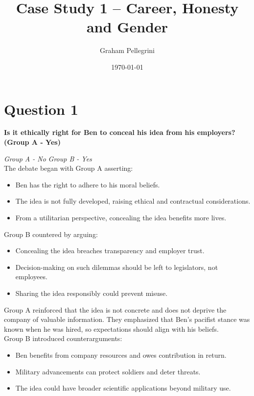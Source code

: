 \documentclass[12pt]{article}
\title{Case Study 1 – Career, Honesty and Gender}
\author{Graham Pellegrini}
\date{\today}
\begin{document}
\maketitle

\section{Question 1}
\textbf{Is it ethically right for Ben to conceal his idea from his employers? (Group A - Yes)}

\textit{Group A - No}  
\textit{Group B - Yes}\\

\noindent The debate began with Group A asserting:
{\fontsize{11pt}{13pt}\selectfont
\begin{itemize}
\setlength{\itemsep}{4pt} %
    \item Ben has the right to adhere to his moral beliefs.
    \item The idea is not fully developed, raising ethical and contractual considerations.
    \item From a utilitarian perspective, concealing the idea benefits more lives.
\end{itemize}
}

\noindent Group B countered by arguing:
{\fontsize{11pt}{13pt}\selectfont
\begin{itemize}
\setlength{\itemsep}{4pt} 
    \item Concealing the idea breaches transparency and employer trust.
    \item Decision-making on such dilemmas should be left to legislators, not employees.
    \item Sharing the idea responsibly could prevent misuse.
\end{itemize}
}

\noindent Group A reinforced that the idea is not concrete and does not deprive the company of valuable information. They emphasized that Ben's pacifist stance was known when he was hired, so expectations should align with his beliefs.\\

\noindent Group B introduced counterarguments:
{\fontsize{11pt}{13pt}\selectfont
\begin{itemize}
\setlength{\itemsep}{4pt} 
    \item Ben benefits from company resources and owes contribution in return.
    \item Military advancements can protect soldiers and deter threats.
    \item The idea could have broader scientific applications beyond military use.
\end{itemize}
}
\end{document}
